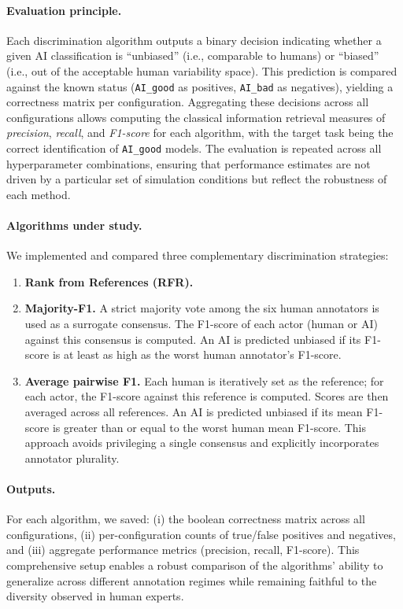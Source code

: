 \documentclass[12pt]{article}
\begin{document}
\paragraph{Evaluation principle.}
Each discrimination algorithm outputs a binary decision indicating whether a given AI
classification is ``unbiased'' (i.e., comparable to humans) or ``biased'' (i.e., out of the
acceptable human variability space). This prediction is compared against the known status
(\texttt{AI\_good} as positives, \texttt{AI\_bad} as negatives), yielding a correctness matrix
per configuration. Aggregating these decisions across all configurations allows computing
the classical information retrieval measures of \emph{precision}, \emph{recall}, and
\emph{F1-score} for each algorithm, with the target task being the correct identification of
\texttt{AI\_good} models. The evaluation is repeated across all hyperparameter combinations,
ensuring that performance estimates are not driven by a particular set of simulation conditions but
reflect the robustness of each method.

\paragraph{Algorithms under study.}
We implemented and compared three complementary discrimination strategies:

\begin{enumerate}
  \item \textbf{Rank from References (RFR).} 

  \item \textbf{Majority-F1.}  
  A strict majority vote among the six human annotators is used as a surrogate
  consensus. The F1-score of each actor (human or AI) against this consensus is
  computed. An AI is predicted unbiased if its F1-score is at least as high as the
  worst human annotator’s F1-score.

  \item \textbf{Average pairwise F1.}  
  Each human is iteratively set as the reference; for each actor, the F1-score against
  this reference is computed. Scores are then averaged across all references. An AI
  is predicted unbiased if its mean F1-score is greater than or equal to the worst human
  mean F1-score. This approach avoids privileging a single consensus and explicitly
  incorporates annotator plurality.

\end{enumerate}

\paragraph{Outputs.}
For each algorithm, we saved: (i) the boolean correctness matrix across all
configurations, (ii) per-configuration counts of true/false positives and negatives, and
(iii) aggregate performance metrics (precision, recall, F1-score). This comprehensive
setup enables a robust comparison of the algorithms’ ability to generalize across
different annotation regimes while remaining faithful to the diversity observed in
human experts.
\end{document}
